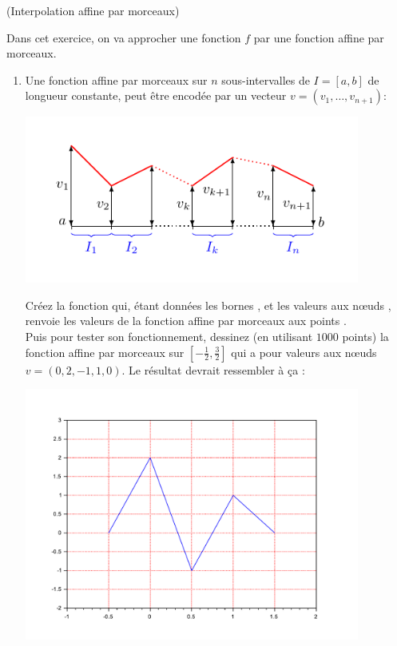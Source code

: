 \documentclass[a4paper,12pt,reqno]{amsart}
\begin{document}
\begin{exo} (Interpolation affine par morceaux)

  Dans cet exercice, on va approcher une fonction $f$ par une fonction affine par morceaux.
  \begin{enumerate}
    \item Une fonction affine par morceaux sur $n$ sous-intervalles de $I=[a,b]$ de longueur constante, peut être encodée par un vecteur $v=(v_{1},\ldots,v_{n+1})$:
    \begin{center}
      \includegraphics[width=11cm]{AffineParMorceaux.pdf}
    \end{center}
    Créez la fonction  qui, étant données les bornes ,  et les valeurs aux nœuds , renvoie les valeurs  de la fonction affine par morceaux aux points .\\
    Puis pour tester son fonctionnement, dessinez (en utilisant $1000$ points) la fonction affine par morceaux sur $[-\frac12, \frac32]$ qui a pour valeurs aux nœuds $v=(0,2,-1,1,0)$. Le résultat devrait ressembler à ça :
    \begin{center}
      \includegraphics[width=11cm]{SciLab_test_affine}
    \end{center}


\end{enumerate}
\end{exo}
\end{document}
